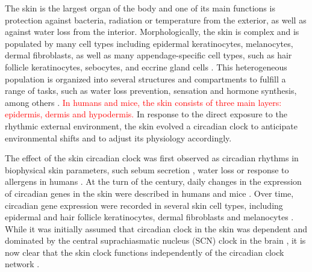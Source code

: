 The skin is the largest organ of the body and one of its main functions is protection against bacteria, radiation or temperature from the exterior, as well as against water loss from the interior. Morphologically, the skin is complex and is populated by many cell types including epidermal keratinocytes, melanocytes, dermal fibroblasts, as well as many appendage-specific cell types, such as hair follicle keratinocytes, sebocytes, and eccrine gland cells \cite{Plikus2015}. This heterogeneous population is organized into several structures and compartments to fulfill a range of tasks, such as water loss prevention, sensation and hormone synthesis, among others \cite{Wong2016, Zouboulis2009}. \textcolor{red}{In humans and mice, the skin consists of three main layers: epidermis, dermis and hypodermis.} In response to the direct exposure to the rhythmic external environment, the skin evolved a circadian clock \cite{Allada2021} to anticipate environmental shifts and to adjust its physiology accordingly. 

\newpage

The effect of the skin circadian clock was first observed as circadian rhythms in biophysical skin parameters, such sebum secretion \cite{Burton1970}, water loss \cite{Spruit1971} or response to allergens in humans \cite{Reinberg1965}. At the turn of the century, daily changes in the expression of circadian genes in the skin were described in humans \cite{Bjarnason2001} and mice \cite{Oishi2002}. Over time, circadian gene expression were recorded in several skin cell types, including epidermal and hair follicle keratinocytes, dermal fibroblasts and melanocytes \cite{Zanello2000, Kawara2002, Brown2005, Brown2008, Spoerl2011}.  While it was initially assumed that circadian clock in the skin was dependent and dominated by the central suprachiasmatic nucleus (SCN) clock in the brain \cite{Tanioka2009}, it is now clear that the skin clock functions independently of the circadian clock network \cite{Welz2019}.

